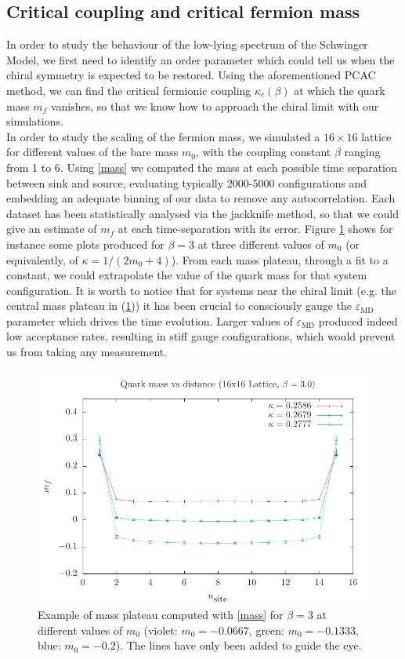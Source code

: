\subsection{Critical coupling and critical fermion mass}
In order to study the behaviour of the low-lying spectrum of the Schwinger Model, we first need to identify an order parameter which could tell us when the chiral symmetry is expected to be restored. Using the aforementioned PCAC method, we can find the critical fermionic coupling $\kappa_c(\beta)$ at which the quark mass $m_f$ vanishes, so that we know how to approach the chiral limit with our simulations.
\\ In order to study the scaling of the fermion mass, we simulated a $16 \times 16$ lattice for different values of the bare mass $m_0$, with the coupling constant $\beta$ ranging from 1 to 6. Using \eqref{mass} we computed the mass at each possible time separation between sink and source, evaluating typically 2000-5000 configurations and embedding an adequate binning of our data to remove any autocorrelation. Each dataset has been statistically analysed via the jackknife method, so that we could give an estimate of $m_f$ at each time-separation with its error. Figure \ref{fig:mass_plateaus} shows for instance some plots produced for $\beta = 3$ at three different values of $m_0$ (or equivalently, of $\kappa = 1/(2m_0 + 4)$). From each mass plateau, through a fit to a constant, we could extrapolate the value of the quark mass for that system configuration. It is worth to notice that for systems near the chiral limit (e.g. the central mass plateau in (\ref{fig:mass_plateaus})) it has been crucial to consciously gauge the $\varepsilon_{\textrm{MD}}$ parameter which drives the time evolution. Larger values of $\varepsilon_{\textrm{MD}}$ produced indeed low acceptance rates, resulting in stiff gauge configurations, which would prevent us from taking any measurement. 
\begin{figure}[H]
    \centering
    \includegraphics[width=0.7\linewidth]{images/m_corr.pdf}
    \caption{Example of mass plateau computed with \eqref{mass} for $\beta = 3$ at different values of $m_0$ (violet: $m_0 = -0.0667$, green: $m_0 = -0.1333$, blue: $m_0 = -0.2$). The lines have only been added to guide the eye.}
    \label{fig:mass_plateaus}
\end{figure}
